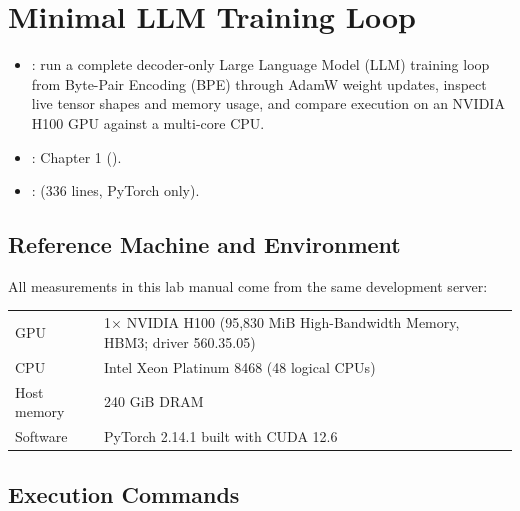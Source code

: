 \chapter{Minimal LLM Training Loop}

\begin{itemize}
    \item {}: run a complete decoder-only Large Language Model (LLM) training loop from Byte-Pair Encoding (BPE) through AdamW weight updates, inspect live tensor shapes and memory usage, and compare execution on an NVIDIA H100 GPU against a multi-core CPU.
    \item {}: Chapter 1 ().
    \item {}:  (336 lines, PyTorch only).
\end{itemize}

\section{Reference Machine and Environment}

All measurements in this lab manual come from the same development server:

\par\vspace{4pt}\noindent\begin{minipage}{\linewidth}
\small
\begin{tabularx}{\linewidth}{@{}l Y@{}}
\toprule
{} &  \\
\midrule
GPU & 1$\times$ NVIDIA H100 (95,830 MiB High-Bandwidth Memory, HBM3; driver 560.35.05) \\
CPU & Intel Xeon Platinum 8468 (48 logical CPUs) \\
Host memory & 240 GiB DRAM \\
Software & PyTorch 2.14.1 built with CUDA 12.6 \\
\bottomrule
\end{tabularx}
\end{minipage}\par\vspace{4pt}

\section{Execution Commands}

